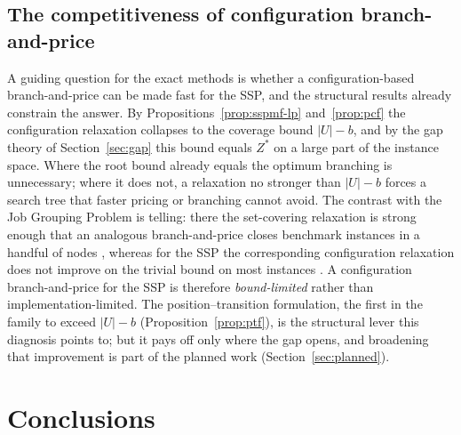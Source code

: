 \documentclass[11pt,a4paper]{article}
\theoremstyle{plain}
\theoremstyle{definition}
\theoremstyle{remark}
\newcommand{\U}{U}
\newcommand{\Zst}{Z^{\ast}}
\begin{document}
\subsection{The competitiveness of configuration branch-and-price}\label{ssec:assess}
A guiding question for the exact methods is whether a configuration-based
branch-and-price can be made fast for the SSP, and the structural results already
constrain the answer. By Propositions~\ref{prop:sspmf-lp} and~\ref{prop:pcf} the
configuration relaxation collapses to the coverage bound $\lvert\U\rvert-b$, and by
the gap theory of Section~\ref{sec:gap} this bound equals $\Zst$ on a large part of
the instance space. Where the root bound already equals the optimum branching is
unnecessary; where it does not, a relaxation no stronger than $\lvert\U\rvert-b$
forces a search tree that faster pricing or branching cannot avoid. The contrast with
the Job Grouping Problem is telling: there the set-covering relaxation is strong enough
that an analogous branch-and-price closes benchmark instances in a handful of nodes
\citep{Otiai2026}, whereas for the SSP the corresponding configuration relaxation does
not improve on the trivial bound on most instances \citep{Moreira2026}. A
configuration branch-and-price for the SSP is therefore \emph{bound-limited} rather
than implementation-limited. The position--transition formulation, the first in the
family to exceed $\lvert\U\rvert-b$ (Proposition~\ref{prop:ptf}), is the structural
lever this diagnosis points to; but it pays off only where the gap opens, and
broadening that improvement is part of the planned work (Section~\ref{sec:planned}).

\section{Conclusions}\label{sec:concl}
\end{document}
